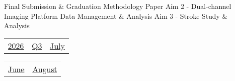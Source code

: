 \vfill{\centering{} \small{Final Submission \& Graduation}\hspace{1.5em} \small{Methodology Paper}\hspace{1.5em} \small{Aim 2 - Dual-channel Imaging Platform}\hspace{1.5em} \small{Data Management \& Analysis}\hspace{1.5em} \small{Aim 3 - Stroke Study \& Analysis}\hspace{1.5em}\par}

\pagebreak
{\noindent\Large\renewcommand{\arraystretch}{\myNumArrayStretch}\begin{tabular}{|l|l|l}
\hyperlink{2026}{2026} & \hyperlink{Q3}{Q3} & \hyperlink{July}{July}
\end{tabular}\hfill%
\begin{tabular}{r|r@{}}
\hyperlink{month-2026-6}{June} & \hyperlink{month-2026-8}{August}
\end{tabular}}
\myLineThick
